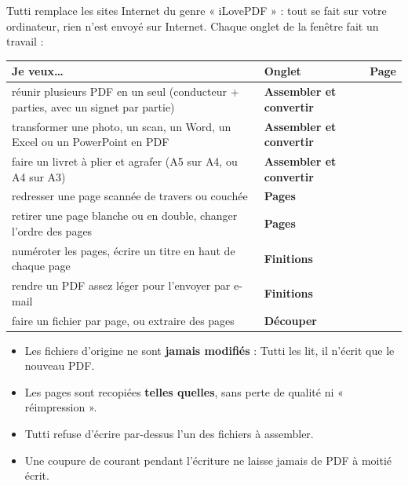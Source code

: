 Tutti remplace les sites Internet du genre « iLovePDF » : tout se fait sur votre ordinateur,
rien n'est envoyé sur Internet. Chaque onglet de la fenêtre fait un travail :

\begin{center}
\renewcommand{\arraystretch}{1.4}
\begin{tabularx}{\linewidth}{>{\raggedright\arraybackslash}X >{\sffamily\bfseries\color{bordeaux}}l c}
\toprule
\textbf{Je veux…} & \textbf{\color{ink}Onglet} & \textbf{Page} \\
\midrule
réunir plusieurs PDF en un seul (conducteur + parties, avec un signet par partie) & Assembler et convertir & \pageref{sec:assembler} \\
transformer une photo, un scan, un Word, un Excel ou un PowerPoint en PDF & Assembler et convertir & \pageref{sec:convertir} \\
faire un livret à plier et agrafer (A5 sur A4, ou A4 sur A3) & Assembler et convertir & \pageref{sec:options} \\
redresser une page scannée de travers ou couchée & Pages & \pageref{sec:pages} \\
retirer une page blanche ou en double, changer l'ordre des pages & Pages & \pageref{sec:pages} \\
numéroter les pages, écrire un titre en haut de chaque page & Finitions & \pageref{sec:finitions} \\
rendre un PDF assez léger pour l'envoyer par e-mail & Finitions & \pageref{sec:finitions} \\
faire un fichier par page, ou extraire des pages & Découper & \pageref{sec:decouper} \\
\bottomrule
\end{tabularx}
\end{center}

\begin{securitebox}
\begin{itemize}
\item Les fichiers d'origine ne sont \textbf{jamais modifiés} : Tutti les lit, il n'écrit que le nouveau PDF.
\item Les pages sont recopiées \textbf{telles quelles}, sans perte de qualité ni « réimpression ».
\item Tutti refuse d'écrire par-dessus l'un des fichiers à assembler.
\item Une coupure de courant pendant l'écriture ne laisse jamais de PDF à moitié écrit.
\end{itemize}
\end{securitebox}


